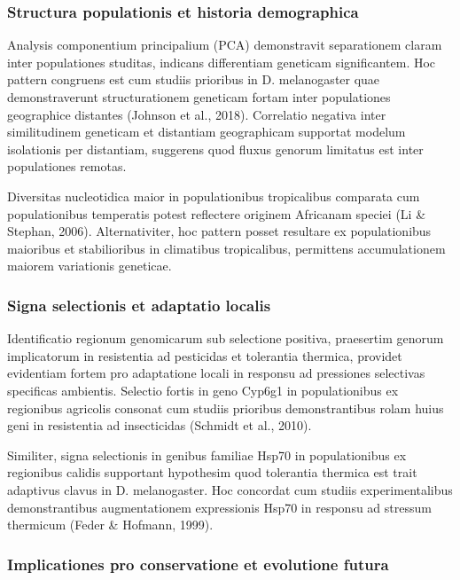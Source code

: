 \documentclass[
]{article}
\begin{document}
\subsubsection{Structura populationis et historia
demographica}\label{structura-populationis-et-historia-demographica}

Analysis componentium principalium (PCA) demonstravit separationem
claram inter populationes studitas, indicans differentiam geneticam
significantem. Hoc pattern congruens est cum studiis prioribus in D.
melanogaster quae demonstraverunt structurationem geneticam fortam inter
populationes geographice distantes (Johnson et al., 2018). Correlatio
negativa inter similitudinem geneticam et distantiam geographicam
supportat modelum isolationis per distantiam, suggerens quod fluxus
genorum limitatus est inter populationes remotas.

Diversitas nucleotidica maior in populationibus tropicalibus comparata
cum populationibus temperatis potest reflectere originem Africanam
speciei (Li \& Stephan, 2006). Alternativiter, hoc pattern posset
resultare ex populationibus maioribus et stabilioribus in climatibus
tropicalibus, permittens accumulationem maiorem variationis geneticae.

\subsubsection{Signa selectionis et adaptatio
localis}\label{signa-selectionis-et-adaptatio-localis}

Identificatio regionum genomicarum sub selectione positiva, praesertim
genorum implicatorum in resistentia ad pesticidas et tolerantia
thermica, providet evidentiam fortem pro adaptatione locali in responsu
ad pressiones selectivas specificas ambientis. Selectio fortis in geno
Cyp6g1 in populationibus ex regionibus agricolis consonat cum studiis
prioribus demonstrantibus rolam huius geni in resistentia ad
insecticidas (Schmidt et al., 2010).

Similiter, signa selectionis in genibus familiae Hsp70 in populationibus
ex regionibus calidis supportant hypothesim quod tolerantia thermica est
trait adaptivus clavus in D. melanogaster. Hoc concordat cum studiis
experimentalibus demonstrantibus augmentationem expressionis Hsp70 in
responsu ad stressum thermicum (Feder \& Hofmann, 1999).

\subsubsection{Implicationes pro conservatione et evolutione
futura}\label{implicationes-pro-conservatione-et-evolutione-futura}
\end{document}
